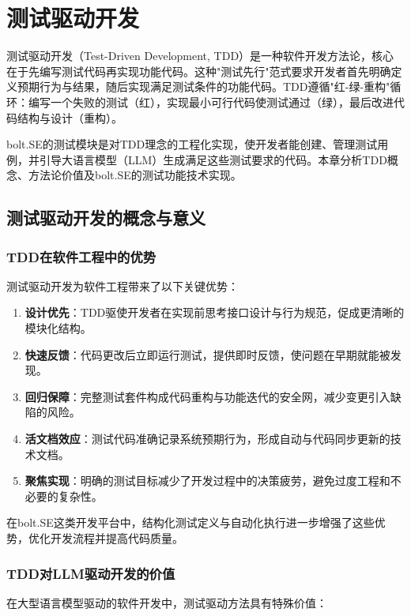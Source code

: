 
\chapter{测试驱动开发}

测试驱动开发（Test-Driven Development, TDD）是一种软件开发方法论，核心在于先编写测试代码再实现功能代码。这种"测试先行"范式要求开发者首先明确定义预期行为与结果，随后实现满足测试条件的功能代码。TDD遵循"红-绿-重构"循环：编写一个失败的测试（红），实现最小可行代码使测试通过（绿），最后改进代码结构与设计（重构）。

bolt.SE的测试模块是对TDD理念的工程化实现，使开发者能创建、管理测试用例，并引导大语言模型（LLM）生成满足这些测试要求的代码。本章分析TDD概念、方法论价值及bolt.SE的测试功能技术实现。

\section{测试驱动开发的概念与意义}

\subsection{TDD在软件工程中的优势}
测试驱动开发为软件工程带来了以下关键优势：

\begin{enumerate}
  \item \textbf{设计优先}：TDD驱使开发者在实现前思考接口设计与行为规范，促成更清晰的模块化结构。
  
  \item \textbf{快速反馈}：代码更改后立即运行测试，提供即时反馈，使问题在早期就能被发现。
  
  \item \textbf{回归保障}：完整测试套件构成代码重构与功能迭代的安全网，减少变更引入缺陷的风险。
  
  \item \textbf{活文档效应}：测试代码准确记录系统预期行为，形成自动与代码同步更新的技术文档。
  
  \item \textbf{聚焦实现}：明确的测试目标减少了开发过程中的决策疲劳，避免过度工程和不必要的复杂性。
\end{enumerate}

在bolt.SE这类开发平台中，结构化测试定义与自动化执行进一步增强了这些优势，优化开发流程并提高代码质量。

\subsection{TDD对LLM驱动开发的价值}
在大型语言模型驱动的软件开发中，测试驱动方法具有特殊价值\cite{Mathews2024}：

